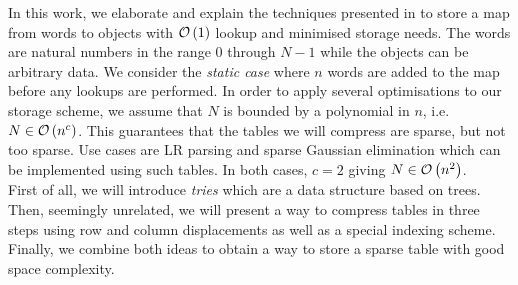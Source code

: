 In this work, we elaborate and explain the techniques presented in \cite{tarjan:storing_sparse_table} to store a map from words to objects with $\mathcal{O}\left(1\right)$ lookup and minimised storage needs.
The words are natural numbers in the range $0$ through $N-1$ while the objects can be arbitrary data.
We consider the \emph{static case} where $n$ words are added to the map before any lookups are performed.
In order to apply several optimisations to our storage scheme, we assume that $N$ is bounded by a polynomial in $n$, i.e.~$N \in \mathcal{O}\left(n^c\right)$.
This guarantees that the tables we will compress are sparse, but not too sparse.
Use cases are LR parsing and sparse Gaussian elimination which can be implemented using such tables.
In both cases, $c = 2$ giving $N \in \mathcal{O}\left(n^2\right)$. \\
First of all, we will introduce \emph{tries} which are a data structure based on trees.
Then, seemingly unrelated, we will present a way to compress tables in three steps using row and column displacements as well as a special indexing scheme.
Finally, we combine both ideas to obtain a way to store a sparse table with good space complexity.
